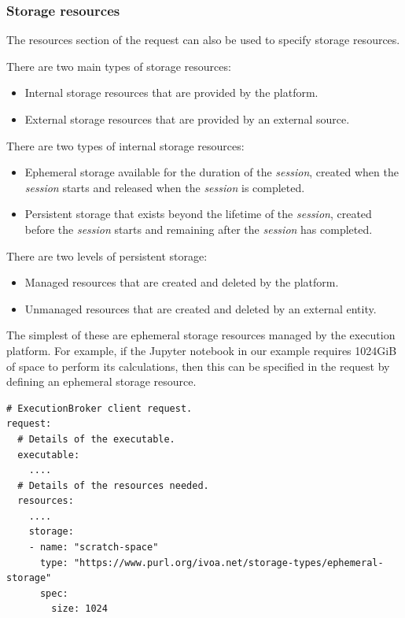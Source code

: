\documentclass[11pt,a4paper]{ivoa}
\newcommand{\workerjob}[1] {\textit{session#1}}
\newcommand{\jupyternotebook} {Jupyter notebook}
\begin{document}
\subsubsection{Storage resources}
\label{storage-resources}

The resources section of the request can also be used to specify storage resources.

There are two main types of storage resources:
\begin{itemize}
    \item Internal storage resources that are provided by the platform.
    \item External storage resources that are provided by an external source.
\end{itemize}

There are two types of internal storage resources:
\begin{itemize}
    \item Ephemeral storage available for the duration of the \workerjob{}, created when the \workerjob{} starts and released when the \workerjob{} is completed.
    \item Persistent storage that exists beyond the lifetime of the \workerjob{}, created before the \workerjob{} starts and remaining after the \workerjob{} has completed.
\end{itemize}

There are two levels of persistent storage:
\begin{itemize}
    \item Managed resources that are created and deleted by the platform.
    \item Unmanaged resources that are created and deleted by an external entity.
\end{itemize}

The simplest of these are ephemeral storage resources managed by the execution platform.
For example, if the \jupyternotebook{} in our example requires 1024GiB of space to perform its calculations,
then this can be specified in the request by defining an ephemeral storage resource.

\begin{lstlisting}[]
# ExecutionBroker client request.
request:
  # Details of the executable.
  executable:
    ....
  # Details of the resources needed.
  resources:
    ....
    storage:
    - name: "scratch-space"
      type: "https://www.purl.org/ivoa.net/storage-types/ephemeral-storage"
      spec:
        size: 1024
\end{lstlisting}
\end{document}

